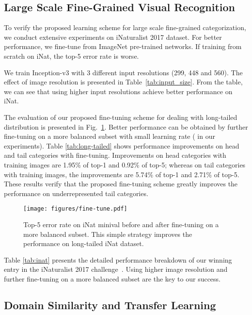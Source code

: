 \documentclass[10pt,twocolumn,letterpaper]{article}
\begin{document}
\subsection{Large Scale Fine-Grained Visual Recognition}
\label{sec:exp_inat}

To verify the proposed learning scheme for large scale fine-grained categorization, we conduct extensive experiments on iNaturalist 2017 dataset.
For better performance, we fine-tune from ImageNet pre-trained networks.
If training from scratch on iNat, the top-5 error rate is  worse.

We train Inception-v3 with 3 different input resolutions (299, 448 and 560).
The effect of image resolution is presented in Table~\ref{tab:input_size}.
From the table, we can see that using higher input resolutions achieve better performance on iNat.


The evaluation of our proposed fine-tuning scheme for dealing with long-tailed distribution is presented in Fig.\ \ref{fig:fine_tune}.
Better performance can be obtained by further fine-tuning on a more balanced subset with small learning rate ( in our experiments).
Table \ref{tab:long-tailed} shows performance improvements on head and tail categories with fine-tuning.
Improvements on head categories with  training images are 1.95\% of top-1 and 0.92\% of top-5; whereas on tail categories with  training images, the improvements are 5.74\% of top-1 and 2.71\% of top-5.
These results verify that the proposed fine-tuning scheme greatly improves the performance on underrepresented tail categories. 



\begin{figure}[t]
\centering
\texttt{[image: figures/fine-tune.pdf]}
\caption{Top-5 error rate on iNat minival before and after fine-tuning on a more balanced subset.
This simple strategy improves the performance on long-tailed iNat dataset.}
\label{fig:fine_tune}
\end{figure}


Table \ref{tab:inat} presents the detailed performance breakdown of our winning entry in the iNaturalist 2017 challenge~\cite{inatchallenge}.
Using higher image resolution and further fine-tuning on a more balanced subset are the key to our success.




\subsection{Domain Similarity and Transfer Learning}
\label{sec:exp_fgvc}
\end{document}
